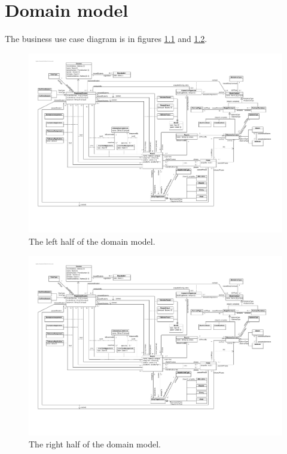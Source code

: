 \chapter{Domain model}
\label{domain-model}

\par The business use case diagram is in figures \ref{fig:domain-model-left}
and \ref{fig:domain-model-right}.

\begin{figure}[H]
	\begin{centering}
		\includegraphics[width=\textwidth]{figs/domain-model-left.pdf}
		\caption{The left half of the domain model.}
		\label{fig:domain-model-left}
	\end{centering}
\end{figure}

\begin{figure}[H]
	\begin{centering}
		\includegraphics{figs/domain-model-right.pdf}
		\caption{The right half of the domain model.}
		\label{fig:domain-model-right}
	\end{centering}
\end{figure}